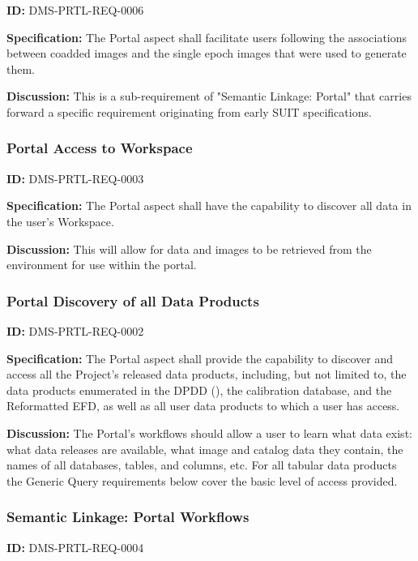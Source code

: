 \documentclass[SE,toc,lsstdraft]{lsstdoc}
\begin{document}
\label{DMS-PRTL-REQ-0006}
\textbf{ID:} DMS-PRTL-REQ-0006

\textbf{Specification:}
The Portal aspect shall facilitate users following the associations between coadded images and the single epoch images that were used to generate them.

\textbf{Discussion:}
This is a sub-requirement of "Semantic Linkage: Portal" that carries forward a specific requirement originating from early SUIT specifications.

\subsubsection{Portal Access to Workspace}

\label{DMS-PRTL-REQ-0003}
\textbf{ID:} DMS-PRTL-REQ-0003

\textbf{Specification:}
The Portal aspect shall have the capability to discover all data in the user's Workspace.

\textbf{Discussion:}
This will allow for data and images to be retrieved from the environment for use within the portal.

\subsubsection{Portal Discovery of all Data Products}

\label{DMS-PRTL-REQ-0002}
\textbf{ID:} DMS-PRTL-REQ-0002

\textbf{Specification:}
The Portal aspect shall provide the capability to discover and access all the Project's released data products, including, but not limited to, the data products enumerated in the DPDD (), the calibration database, and the Reformatted EFD, as well as all user data products to which a user has access.

\textbf{Discussion:}
The Portal's workflows should allow a user to learn what data exist: what data releases are available, what image and catalog data they contain, the names of all databases, tables, and columns, etc.
For all tabular data products the Generic Query requirements below cover the basic level of access provided.

\subsubsection{Semantic Linkage: Portal Workflows}

\label{DMS-PRTL-REQ-0004}
\textbf{ID:} DMS-PRTL-REQ-0004
\end{document}
